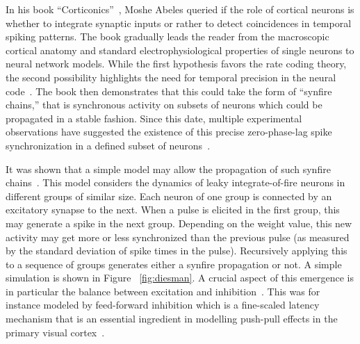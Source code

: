 \documentclass[brainsci, %
               review,submit,pdftex,moreauthors]{Definitions/mdpi}
\begin{document}
In his book ``Corticonics''~\citep{abeles_corticonics_1991}, Moshe Abeles queried if the role of cortical neurons is whether to integrate synaptic inputs or rather to detect coincidences in temporal spiking patterns. The book gradually leads the reader from the macroscopic cortical anatomy and standard electrophysiological properties of single neurons to neural network models. While the first hypothesis favors the rate coding theory, the second possibility highlights the need for temporal precision in the neural code~\citep{paugam-moisy_computing_2012}. The book then demonstrates that this could take the form of ``synfire chains,'' that is synchronous activity on subsets of neurons which could be propagated in a stable fashion. Since this date, multiple experimental observations have suggested the existence of this precise zero-phase-lag spike synchronization in a defined subset of neurons~\citep{harris_organization_2003}.

It was shown that a simple model may allow the propagation of such synfire chains~\citep{gewaltig_propagation_1970}. This model considers the dynamics of leaky integrate-of-fire neurons in different groups of similar size. Each neuron of one group is connected by an excitatory synapse to the next. When a pulse is elicited in the first group, this may generate a spike in the next group. Depending on the weight value, this new activity may get more or less synchronized than the previous pulse (as measured by the standard deviation of spike times in the pulse). Recursively applying this to a sequence of groups generates either a synfire propagation or not. A simple simulation is shown in Figure
~\ref{fig:diesman}. A crucial aspect of this emergence is in particular the balance between excitation and inhibition~\citep{azouz_stimulus-selective_2008}. This was for instance modeled by feed-forward inhibition which is a fine-scaled latency mechanism that is an essential ingredient in modelling push-pull effects in the primary visual cortex~\citep{kremkow_push-pull_2016}.
\end{document}
